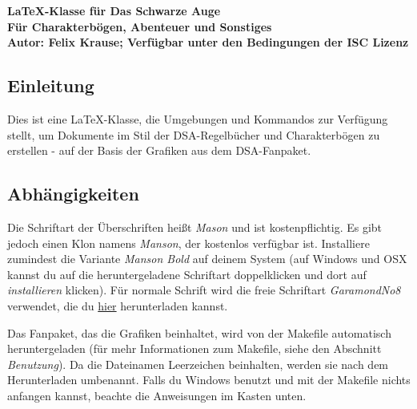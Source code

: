 \documentclass{dsa}
\begin{document}
   \begin{dsaTitlePage}
      \bfseries \Huge \LaTeX-Klasse für Das Schwarze Auge \\[15pt]
      \LARGE Für Charakterbögen, Abenteuer und Sonstiges \\[40pt]
      \large Autor: Felix Krause; Verfügbar unter den Bedingungen der ISC Lizenz
   \end{dsaTitlePage}
   
   
   \subsection*{Einleitung}
   
   Dies ist eine \LaTeX-Klasse, die Umgebungen und Kommandos zur Verfügung
   stellt, um Dokumente im Stil der DSA-Regelbücher und Charakterbögen zu 
   erstellen - auf der Basis der Grafiken aus dem DSA-Fanpaket.
   
   \subsection*{Abhängigkeiten}
   
   Die Schriftart der Überschriften heißt \textit{Mason} und ist
   kostenpflichtig. Es gibt jedoch einen Klon namens \textit{Manson}, der
   kostenlos verfügbar ist. Installiere zumindest die Variante
   \textit{Manson Bold} auf deinem System (auf Windows und OSX kannst du auf
   die heruntergeladene Schriftart doppelklicken und dort auf
   \textit{installieren} klicken). Für normale Schrift wird die freie Schriftart
   \textit{GaramondNo8} verwendet, die du \href{http://garamond.org}{hier}
   herunterladen kannst.
   
   Das Fanpaket, das die Grafiken beinhaltet, wird von der Makefile automatisch
   heruntergeladen (für mehr Informationen zum Makefile, siehe den Abschnitt
   \textit{Benutzung}). Da die Dateinamen Leerzeichen beinhalten, werden sie
   nach dem Herunterladen umbenannt. Falls du Windows benutzt und mit der
   Makefile nichts anfangen kannst, beachte die Anweisungen im Kasten unten.
   
   \vspace{12pt}
   
\end{document}
